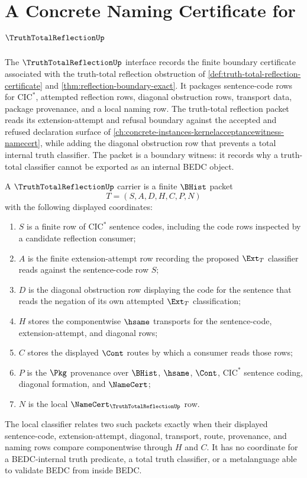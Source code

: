 \chapter{A Concrete Naming Certificate for $\TruthTotalReflectionUp$}
\label{ch:concrete-instances-truthtotalreflection-namecert}

The $\TruthTotalReflectionUp$ interface records the finite boundary certificate associated with the truth-total reflection obstruction of \autoref{def:truth-total-reflection-certificate} and \autoref{thm:reflection-boundary-exact}. It packages sentence-code rows for $\mathrm{CIC}^{*}$, attempted reflection rows, diagonal obstruction rows, transport data, package provenance, and a local naming row. The truth-total reflection packet reads its extension-attempt and refusal boundary against the accepted and refused declaration surface of \autoref{ch:concrete-instances-kernelacceptancewitness-namecert}, while adding the diagonal obstruction row that prevents a total internal truth classifier. The packet is a boundary witness: it records why a truth-total classifier cannot be exported as an internal BEDC object.

\begin{definition}
\label{def:truth-total-reflection-namecert-carrier}
A $\TruthTotalReflectionUp$ carrier is a finite $\BHist$ packet
$$
T=(S,A,D,H,C,P,N)
$$
with the following displayed coordinates:
\begin{enumerate}
\item $S$ is a finite row of $\mathrm{CIC}^{*}$ sentence codes, including the code rows inspected by a candidate reflection consumer;
\item $A$ is the finite extension-attempt row recording the proposed $\Ext_T$ classifier reads against the sentence-code row $S$;
\item $D$ is the diagonal obstruction row displaying the code for the sentence that reads the negation of its own attempted $\Ext_T$ classification;
\item $H$ stores the componentwise $\hsame$ transports for the sentence-code, extension-attempt, and diagonal rows;
\item $C$ stores the displayed $\Cont$ routes by which a consumer reads those rows;
\item $P$ is the $\Pkg$ provenance over $\BHist$, $\hsame$, $\Cont$, $\mathrm{CIC}^{*}$ sentence coding, diagonal formation, and $\NameCert$;
\item $N$ is the local $\NameCert_{\TruthTotalReflectionUp}$ row.
\end{enumerate}
The local classifier relates two such packets exactly when their displayed sentence-code, extension-attempt, diagonal, transport, route, provenance, and naming rows compare componentwise through $H$ and $C$. It has no coordinate for a BEDC-internal truth predicate, a total truth classifier, or a metalanguage able to validate BEDC from inside BEDC.
\end{definition}

